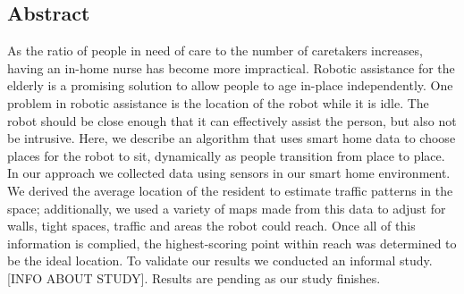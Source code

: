 \documentclass[11pt, draft, a4paper]{IEEEtran}
\begin{document}
\subsection{Abstract}
As the ratio of people in need of care to the number of caretakers increases, having an in-home nurse has become more impractical. Robotic assistance for the elderly is a promising solution to allow people to age in-place independently. One problem in robotic assistance is the location of the robot while it is idle. The robot should be close enough that it can effectively assist the person, but also not be intrusive. Here, we describe an algorithm that uses smart home data to choose places for the robot to sit, dynamically as people transition from place to place. In our approach we collected data using sensors in our smart home environment. We derived the average location of the resident to estimate traffic patterns in the space; additionally, we used a variety of maps made from this data to adjust for walls, tight spaces, traffic and areas the robot could reach. Once all of this information is complied, the highest-scoring point within reach was determined to be the ideal location. To validate our results we conducted an informal study. [INFO ABOUT STUDY]. Results are pending as our study finishes.
\end{document}
